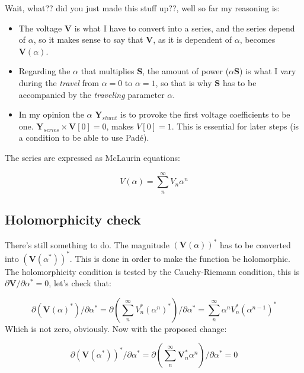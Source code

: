 \documentclass[a4paper,twoside,fleqn]{tufte-book}
\begin{document}
Wait, what?? did you just made this stuff up??, well so far my reasoning is:
\begin{itemize}
	\item The voltage $\textbf{V}$ is what I have to convert into a series, and the series depend of $\alpha$, so it makes sense to say that $\textbf{V}$, as it is dependent of $\alpha$, becomes $\textbf{V}(\alpha)$.
	
	\item Regarding the $\alpha$ that multiplies $\textbf{S}$, the amount of power ($\alpha \textbf{S}$) is what I vary during the \textit{travel} from $\alpha=0$ to $\alpha=1$, so that is why $\textbf{S}$ has to be accompanied by the \textit{traveling} parameter $\alpha.$
	
	\item In my opinion the $\alpha$ $\textbf{Y}_{shunt}$ is to provoke the first voltage coefficients to be one.  $\textbf{Y}_{series} \times \textbf{V}[0] = 0$, makes $V[0]=1$. This is essential for later steps (is a condition to be able to use Pad\'e). \newline
\end{itemize}

The series are expressed as McLaurin equations:

\begin{equation}
V(\alpha) = \sum_{n}^{\infty} V_n \alpha ^n
\label{eq:McLaurinV}
\end{equation}

\subsection{Holomorphicity check}
	
	There's still something to do. The magnitude $\left(\textbf{V}( \alpha )\right)^*$ has to be converted into $\left(\textbf{V}( \alpha^* )\right)^*$. This is done in order to make the function be holomorphic. The holomorphicity condition is tested by the Cauchy-Riemann condition, this is $\partial \textbf{V} / \partial \alpha^* = 0$, let's check that:
	
	\begin{equation}
	\partial \left(\textbf{V}( \alpha )^*\right) / \partial \alpha^*  = \partial \left(\sum_{n}^{\infty} V_n^* (\alpha ^n)^*\right) / \partial \alpha^*  = \sum_{n}^{\infty} \alpha ^n V_n^* (\alpha ^{n-1})^*
	\end{equation} 
	Which is not zero, obviously. Now with the proposed change:
	
	\begin{equation}
	\partial \left( \textbf{V}( \alpha^* )\right)^* / \partial \alpha^*  = \partial \left(\sum_{n}^{\infty} \textbf{V}_n^* \alpha ^n \right) / \partial \alpha^*  = 0
	\end{equation} 
	
\end{document}
